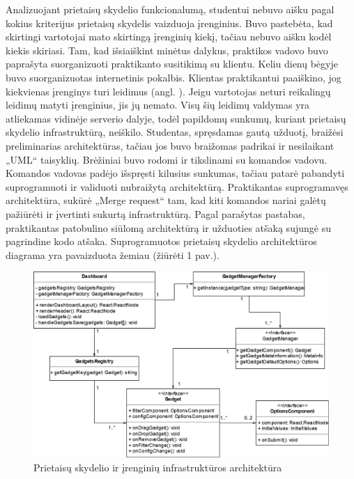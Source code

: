 \documentclass{VUMIFPSbakalaurinis}
\begin{document}
Analizuojant prietaisų skydelio funkcionalumą, studentui nebuvo aišku pagal kokius kriterijus prietaisų skydelis vaizduoja įrenginius. Buvo pastebėta, kad skirtingi vartotojai mato skirtingą įrenginių kiekį, tačiau nebuvo aišku kodėl kiekis skiriasi. Tam, kad išsiaiškint minėtus dalykus, praktikos vadovo buvo paprašyta suorganizuoti praktikanto susitikimą su klientu. Keliu dienų bėgyje buvo suorganizuotas internetinis pokalbis. Klientas praktikantui paaiškino, jog kiekvienas įrenginys turi leidimus (angl. ). Jeigu vartotojas neturi reikalingų leidimų matyti įrenginius, jis jų nemato. Visų šių leidimų valdymas yra atliekamas vidinėje serverio dalyje, todėl papildomų sunkumų, kuriant prietaisų skydelio infrastruktūrą, neiškilo. Studentas, spręsdamas gautą užduotį, braižėsi preliminarias architektūras, tačiau jos buvo braižomas padrikai ir nesilaikant „UML“ taisyklių. Brėžiniai buvo rodomi ir tikslinami su komandos vadovu. Komandos vadovas padėjo išspręsti kilusius sunkumas, tačiau patarė pabandyti suprogramuoti ir validuoti nubraižytą architektūrą. Praktikantas suprogramavęs architektūra, sukūrė „Merge request“ tam, kad kiti komandos nariai galėtų pažiūrėti ir įvertinti sukurtą infrastruktūrą. Pagal parašytas pastabas, praktikantas patobulino siūlomą architektūrą ir užduoties atšaką sujungė su pagrindine kodo atšaka. Suprogramuotos prietaisų skydelio architektūros diagrama yra pavaizduota žemiau (žiūrėti 1 pav.).


\begin{figure}[H]
    \centering
    \includegraphics[scale=0.45]{images/gadgets}
    \caption{Prietaisų skydelio ir įrenginių infrastruktūros architektūra} 
\end{figure}
\end{document}
